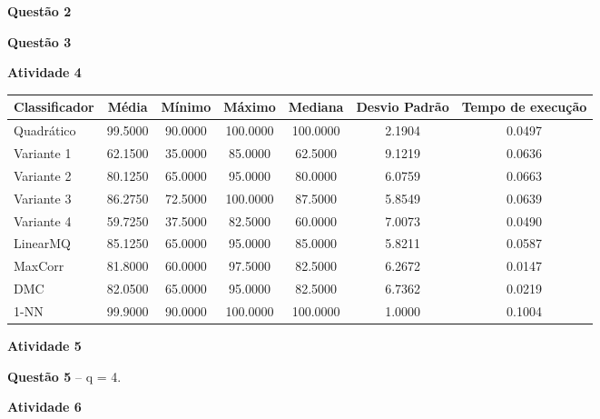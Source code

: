 \documentclass[12pt]{article}
\begin{document}
	\textbf{Questão 2}
	
	\textbf{Questão 3}
	
	\hfill
	
	\textbf{Atividade 4}
	
	\hfill
	
	\begin{tabular}{lcccccc}
		\hline
		Classificador & Média & Mínimo & Máximo & Mediana & Desvio Padrão & Tempo de execução \\
		\hline
		Quadrático &     99.5000 &  90.0000 & 100.0000 & 100.0000 &   2.1904 &  0.0497 \\
		Variante 1 &     62.1500 &  35.0000 &  85.0000 &  62.5000 &   9.1219 &  0.0636 \\
		Variante 2 &     80.1250 &  65.0000 &  95.0000 &  80.0000 &   6.0759 &  0.0663 \\
		Variante 3 &     86.2750 &  72.5000 & 100.0000 &  87.5000 &   5.8549 &  0.0639 \\
		Variante 4 &     59.7250 &  37.5000 &  82.5000 &  60.0000 &   7.0073 &  0.0490 \\
		LinearMQ   &     85.1250 &  65.0000 &  95.0000 &  85.0000 &   5.8211 &  0.0587 \\
		MaxCorr    &     81.8000 &  60.0000 &  97.5000 &  82.5000 &   6.2672 &  0.0147 \\
		DMC        &     82.0500 &  65.0000 &  95.0000 &  82.5000 &   6.7362 &  0.0219 \\
		1-NN       &     99.9000 &  90.0000 & 100.0000 & 100.0000 &   1.0000 &  0.1004 \\
		\hline
	\end{tabular}
	
	\hfill
	
	\textbf{Atividade 5}
	
	\textbf{Questão 5} -- q = 4.
	
	\textbf{Atividade 6}
	
	\hfill
	
\end{document}

